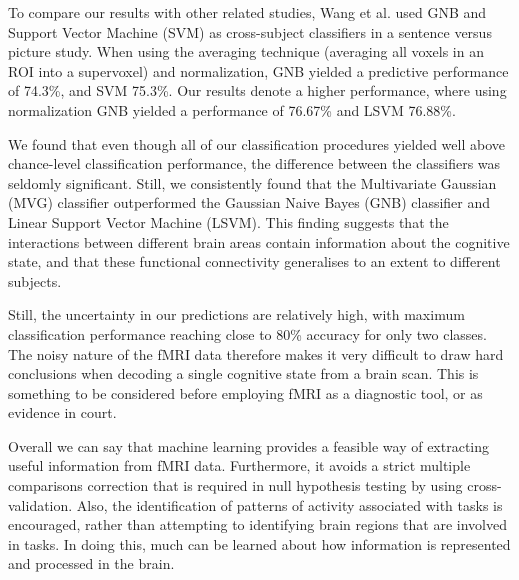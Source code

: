 \documentclass[preprint,journal,11pt]{vgtc}
\begin{document}
To compare our results with other related studies, Wang et al. \cite{wa:2003betw} used GNB and Support Vector Machine (SVM) as cross-subject classifiers in a sentence versus picture study. When using the averaging technique (averaging all voxels in an ROI into a supervoxel) and normalization, GNB yielded a predictive performance of 74.3\%, and SVM 75.3\%. Our results denote a higher performance, where using normalization GNB yielded a performance of 76.67\% and LSVM 76.88\%. 

We found that even though all of our classification procedures yielded well above chance-level classification performance, the difference between the classifiers was seldomly significant. Still, we consistently found that the Multivariate Gaussian (MVG) classifier outperformed the Gaussian Naive Bayes (GNB) classifier and Linear Support Vector Machine (LSVM). This finding suggests that the interactions between different brain areas contain information about the cognitive state, and that these functional connectivity generalises to an extent to different subjects.

Still, the uncertainty in our predictions are relatively high, with maximum classification performance reaching close to 80\% accuracy for only two classes. The noisy nature of the fMRI data therefore makes it very difficult to draw hard conclusions when decoding a single cognitive state from a brain scan. This is something to be considered before employing fMRI as a diagnostic tool, or as evidence in court.

Overall we can say that machine learning provides a feasible way of extracting useful information from fMRI data. Furthermore, it avoids a strict multiple comparisons correction that is required in null hypothesis testing by using cross-validation. Also, the identification of patterns of activity associated with tasks is encouraged, rather than attempting to identifying brain regions that are involved in tasks. In doing this, much can be learned about how information is represented and processed in the brain.




\end{document}
